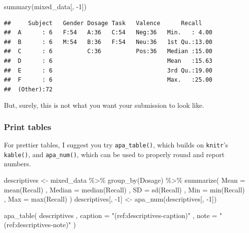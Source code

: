 \documentclass[
  man,floatsintext]{apa6}
\newenvironment{Shaded}{\begin{snugshade}}{\end{snugshade}}
\newcommand{\AttributeTok}[1]{\textcolor[rgb]{0.77,0.63,0.00}{#1}}
\newcommand{\DecValTok}[1]{\textcolor[rgb]{0.00,0.00,0.81}{#1}}
\newcommand{\FunctionTok}[1]{\textcolor[rgb]{0.00,0.00,0.00}{#1}}
\newcommand{\NormalTok}[1]{#1}
\newcommand{\OtherTok}[1]{\textcolor[rgb]{0.56,0.35,0.01}{#1}}
\newcommand{\SpecialCharTok}[1]{\textcolor[rgb]{0.00,0.00,0.00}{#1}}
\newcommand{\StringTok}[1]{\textcolor[rgb]{0.31,0.60,0.02}{#1}}
\begin{document}
\begin{Shaded}
\begin{Highlighting}[]
\FunctionTok{summary}\NormalTok{(mixed\_data[, }\SpecialCharTok{{-}}\DecValTok{1}\NormalTok{])}
\end{Highlighting}
\end{Shaded}

\begin{verbatim}
##     Subject   Gender Dosage Task   Valence      Recall     
##  A      : 6   F:54   A:36   C:54   Neg:36   Min.   : 4.00  
##  B      : 6   M:54   B:36   F:54   Neu:36   1st Qu.:13.00  
##  C      : 6          C:36          Pos:36   Median :15.00  
##  D      : 6                                 Mean   :15.63  
##  E      : 6                                 3rd Qu.:19.00  
##  F      : 6                                 Max.   :25.00  
##  (Other):72
\end{verbatim}

But, surely, this is not what you want your submission to look like.

\hypertarget{print-tables}{%
\subsubsection{Print tables}\label{print-tables}}

For prettier tables, I suggest you try \texttt{apa\_table()}, which builds on \texttt{knitr}'s \texttt{kable()}, and \texttt{apa\_num()}, which can be used to properly round and report numbers.





\begin{Shaded}
\begin{Highlighting}[]
\NormalTok{descriptives }\OtherTok{\textless{}{-}}\NormalTok{ mixed\_data }\SpecialCharTok{\%\textgreater{}\%}
  \FunctionTok{group\_by}\NormalTok{(Dosage) }\SpecialCharTok{\%\textgreater{}\%}
  \FunctionTok{summarize}\NormalTok{(}
    \AttributeTok{Mean =} \FunctionTok{mean}\NormalTok{(Recall)}
\NormalTok{    , }\AttributeTok{Median =} \FunctionTok{median}\NormalTok{(Recall)}
\NormalTok{    , }\AttributeTok{SD =} \FunctionTok{sd}\NormalTok{(Recall)}
\NormalTok{    , }\AttributeTok{Min =} \FunctionTok{min}\NormalTok{(Recall)}
\NormalTok{    , }\AttributeTok{Max =} \FunctionTok{max}\NormalTok{(Recall)}
\NormalTok{  )}
\NormalTok{descriptives[, }\SpecialCharTok{{-}}\DecValTok{1}\NormalTok{] }\OtherTok{\textless{}{-}} \FunctionTok{apa\_num}\NormalTok{(descriptives[, }\SpecialCharTok{{-}}\DecValTok{1}\NormalTok{])}

\FunctionTok{apa\_table}\NormalTok{(}
\NormalTok{  descriptives}
\NormalTok{  , }\AttributeTok{caption =} \StringTok{"(ref:descriptives{-}caption)"}
\NormalTok{  , }\AttributeTok{note =} \StringTok{"(ref:descriptives{-}note)"}
\NormalTok{)}
\end{Highlighting}
\end{Shaded}
\end{document}
